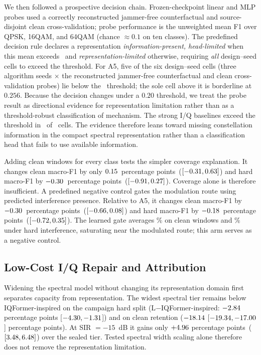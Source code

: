 \documentclass[letterpaper,journal]{IEEEtran}
\newcommand{\pp}{percentage points}
\begin{document}
We then followed a prospective decision chain.
Frozen-checkpoint linear and MLP probes used a correctly reconstructed
jammer-free counterfactual and \mbox{source-disjoint} clean cross-validation; probe
performance is the unweighted mean F1 over QPSK, 16QAM, and 64QAM (chance
$\approx0.1$ on ten classes). The predefined decision rule declares a representation
\emph{information-present, head-limited} when this mean exceeds
\ProbeThreshold\ and \emph{representation-limited} otherwise, requiring
\emph{all} design--seed cells to exceed the threshold. For A5,
five of the six design--seed cells (three algorithm
seeds $\times$ the reconstructed jammer-free counterfactual and clean
cross-validation probes) lie below the \ProbeThreshold\ threshold; the sole
cell above it is borderline at $0.256$. Because the decision changes under a
$0.20$ threshold, we treat the probe result as directional evidence for
representation limitation rather than as a threshold-robust classification of
mechanism.
The strong I/Q baselines exceed the threshold in
\ProbeStrongAboveThreshold\ of \ProbeStrongCells\ cells. The evidence
therefore leans toward missing constellation information in the compact
spectral representation rather than a classification head that fails to use
available information.

Adding clean windows for every class tests the simpler coverage explanation.
It changes clean macro-F1 by only $0.15$\ \pp\
($[-0.31,0.63]$) and hard macro-F1 by
$-0.30$\ \pp\ ($[-0.91,0.27]$). Coverage
alone is therefore insufficient. A predefined negative control gates the
modulation route using predicted interference presence. Relative to A5, it
changes clean macro-F1 by $-0.30$\ \pp\
($[-0.66,0.08]$) and hard
macro-F1 by $-0.18$\ \pp\
($[-0.72,0.35]$). The learned
gate averages \PresenceGateCleanMean\% on clean windows and
\PresenceGateHardMean\% under hard interference, saturating near the modulated
route; this arm serves as a negative control.

\subsection{Low-Cost I/Q Repair and Attribution}
Widening the spectral model without changing its representation domain first
separates capacity from representation. The widest spectral tier remains below
IQFormer-inspired on the campaign hard split (L$-$IQFormer-inspired:
$-2.84$ percentage points
[$-4.30,-1.31$]) and on clean
retention ($-18.14$
[$-19.34,-17.00$] percentage
points). At SIR $=-15$~dB it gains only $+4.96$ \pp\
($[3.48,6.48]$) over the sealed tier.
Tested spectral width scaling alone therefore does not remove the
representation limitation.
\end{document}
